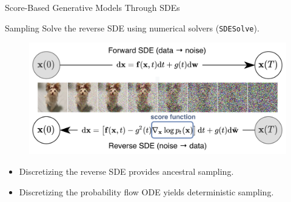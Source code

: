 \documentclass{beamer}
\begin{document}
\begin{frame}{Score-Based Generative Models Through SDEs}
	\begin{block}{Sampling}
		Solve the reverse SDE using numerical solvers (\texttt{SDESolve}).
		\begin{figure}
			\includegraphics[width=0.8\linewidth]{figs/sbgm}
		\end{figure}
		\vspace{-0.5cm}
	\end{block}
	\begin{itemize}
		\item Discretizing the reverse SDE provides ancestral sampling.
		\item Discretizing the probability flow ODE yields deterministic sampling.
	\end{itemize}
\end{frame}
\end{document}
